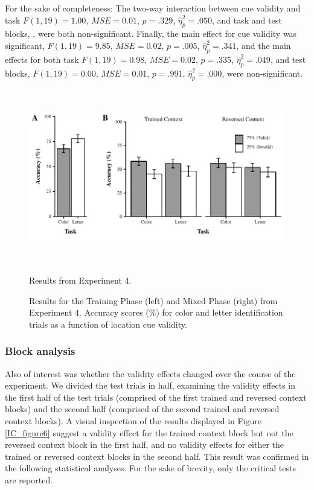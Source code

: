 \documentclass[]{DissertateCUNY}
\begin{document}
For the sake of completeness: The two-way interaction between cue
validity and task \(F(1, 19) = 1.00\), \(\mathit{MSE} = 0.01\),
\(p = .329\), \(\hat{\eta}^2_p = .050\), and task and test blocks, ,
were both non-significant. Finally, the main effect for cue validity was
significant, \(F(1, 19) = 9.85\), \(\mathit{MSE} = 0.02\), \(p = .005\),
\(\hat{\eta}^2_p = .341\), and the main effects for both task
\(F(1, 19) = 0.98\), \(\mathit{MSE} = 0.02\), \(p = .335\),
\(\hat{\eta}^2_p = .049\), and test blocks, \(F(1, 19) = 0.00\),
\(\mathit{MSE} = 0.01\), \(p = .991\), \(\hat{\eta}^2_p = .000\), were
non-significant.

\begin{figure}
  \centering
  \includegraphics[height=3in]{figures/ICfigure5.pdf}
  \caption{Results from Experiment 4.}
  \caption*{Results for the Training Phase (left) and Mixed Phase (right) from Experiment 4. Accuracy scores (\%) for color and letter identification trials as a function of location cue validity.}
  \label{IC_figure5}
\end{figure}

\hypertarget{block-analysis}{%
\subsubsection{Block analysis}\label{block-analysis}}

Also of interest was whether the validity effects changed over the
course of the experiment. We divided the test trials in half, examining
the validity effects in the first half of the test trials (comprised of
the first trained and reversed context blocks) and the second half
(comprised of the second trained and reversed context blocks). A visual
inspection of the results displayed in Figure \ref{IC_figure6} suggest a
validity effect for the trained context block but not the reversed
context block in the first half, and no validity effects for either the
trained or reversed context blocks in the second half. This result was
confirmed in the following statistical analyses. For the sake of
brevity, only the critical tests are reported.
\end{document}
